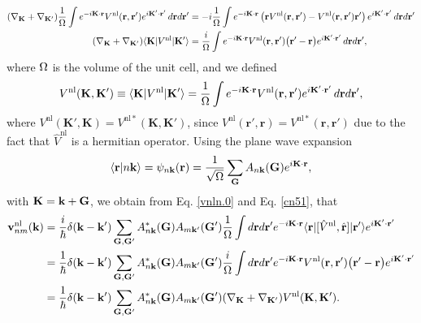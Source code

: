 \documentclass[letterpaper,aps]{revtex4}
\begin{document}
\begin{align}\label{cn51}
(\nabla_\mathbf{K}+\nabla_{\mathbf{K}'})
\frac{1}{\Omega}
\int e^{-i\mathbf{K}\cdot\mathbf{r}}
V^\mathrm{nl}(\mathbf{r},\mathbf{r}')
e^{i\mathbf{K}'\cdot\mathbf{r}'}
\,d\mathbf{r} d\mathbf{r}'
&=
-i
\frac{1}{\Omega}
\int e^{-i\mathbf{K}\cdot\mathbf{r}}
\left(
\mathbf{r}
V^\mathrm{nl}(\mathbf{r},\mathbf{r}')
-
V^\mathrm{nl}(\mathbf{r},\mathbf{r}')
\mathbf{r}'
\right)
e^{i\mathbf{K}'\cdot\mathbf{r}'}
\,d\mathbf{r} d\mathbf{r}'
\nonumber\\
(\nabla_\mathbf{K}+\nabla_{\mathbf{K}'})
\langle \mathbf{K} |
V^\mathrm{nl}
| \mathbf{K}' \rangle
&=
\frac{i}{\Omega}
\int e^{-i\mathbf{K}\cdot\mathbf{r}}
V^\mathrm{nl}(\mathbf{r},\mathbf{r}')
\big(
\mathbf{r}'
-
\mathbf{r}
\big)
e^{i\mathbf{K}'\cdot\mathbf{r}'}
\,d\mathbf{r} d\mathbf{r}'
,
\end{align}
where $\Omega$ is the volume of the unit cell,  
and we defined
\begin{align}\label{cn52}
V^\mathrm{nl}(\mathbf{K},\mathbf{K}') 
\equiv
\langle \mathbf{K} |
V^\mathrm{nl}
| \mathbf{K}' \rangle
=
\frac{1}{\Omega}
\int e^{-i\mathbf{K}\cdot\mathbf{r}}
V^\mathrm{nl}(\mathbf{r},\mathbf{r}')
e^{i\mathbf{K}'\cdot\mathbf{r}'}
\,d\mathbf{r} d\mathbf{r}'
,
\end{align}
where 
$V^\mathrm{nl}(\mathbf{K}',\mathbf{K}) =V^{\mathrm{nl} *}(\mathbf{K},\mathbf{K}')$, since
$V^\mathrm{nl}(\mathbf{r}',\mathbf{r})=V^{\mathrm{nl}*}(\mathbf{r},\mathbf{r}')$ due to the fact that $\hat
V^\mathrm{nl}$ is a hermitian operator.
Using the 
plane wave expansion
\begin{align}\label{cn3}
\langle {\mathbf{r}} | {n\mathbf{k}} \rangle=\psi_{n\mathbf{k}}(\mathbf{r})=\frac{1}{\sqrt{\Omega}}
\sum_{\mathbf{G}} A_{n\mathbf{k}}(\mathbf{G})e^{i\mathbf{K}\cdot\mathbf{r}}
,
\end{align}
with $\mathbf{K}=\mathbf{k}+\mathbf{G}$, we
obtain from Eq. \eqref{vnln.0} and Eq. \eqref{cn51}, that
\begin{align}\label{vnln.2}
\mathbf{v}^\mathrm{nl}_{nm}(\mathbf{k})
&=
\frac{i}{\hbar}
\delta(\mathbf{k}-\mathbf{k}')
\sum_{\mathbf{G},\mathbf{G}'}
A^*_{n\mathbf{k}}(\mathbf{G}) 
A_{m\mathbf{k}'}(\mathbf{G}')
\frac{1}{\Omega}
\int d\mathbf{r} d\mathbf{r}'
e^{-i\mathbf{K}\cdot\mathbf{r}}
\langle \mathbf{r} |
[\hat{V}^\mathrm{nl},\hat{\mathbf{r}}]
| \mathbf{r}' \rangle
e^{i\mathbf{K}'\cdot\mathbf{r}'}
\nonumber\\
&=
\frac{1}{\hbar}
\delta(\mathbf{k}-\mathbf{k}')
\sum_{\mathbf{G},\mathbf{G}'}
A^*_{n\mathbf{k}}(\mathbf{G}) 
A_{m\mathbf{k}'}(\mathbf{G}')
\frac{i}{\Omega}
\int d\mathbf{r} d\mathbf{r}'
e^{-i\mathbf{K}\cdot\mathbf{r}}
V^\mathrm{nl}(\mathbf{r},\mathbf{r}')
\big(\mathbf{r}'-\mathbf{r}\big)
e^{i\mathbf{K}'\cdot\mathbf{r}'}
\nonumber\\
&=
\frac{1}{\hbar}
\delta(\mathbf{k}-\mathbf{k}')
\sum_{\mathbf{G},\mathbf{G}'}
A^*_{n\mathbf{k}}(\mathbf{G}) 
A_{m\mathbf{k}'}(\mathbf{G}')
(\nabla_\mathbf{K}+\nabla_{\mathbf{K}'})
V^\mathrm{nl}(\mathbf{K},\mathbf{K}')
.
\end{align}  
\end{document}

